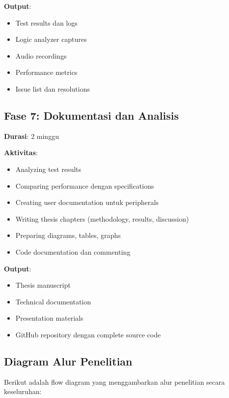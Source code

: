 \textbf{Output}:
\begin{itemize}
	\item Test results dan logs
	\item Logic analyzer captures
	\item Audio recordings
	\item Performance metrics
	\item Issue list dan resolutions
\end{itemize}

\subsection{Fase 7: Dokumentasi dan Analisis}

\textbf{Durasi}: 2 minggu

\textbf{Aktivitas}:
\begin{itemize}
	\item Analyzing test results
	\item Comparing performance dengan specifications
	\item Creating user documentation untuk peripherals
	\item Writing thesis chapters (methodology, results, discussion)
	\item Preparing diagrams, tables, graphs
	\item Code documentation dan commenting
\end{itemize}

\textbf{Output}:
\begin{itemize}
	\item Thesis manuscript
	\item Technical documentation
	\item Presentation materials
	\item GitHub repository dengan complete source code
\end{itemize}

\subsection{Diagram Alur Penelitian}

Berikut adalah flow diagram yang menggambarkan alur penelitian secara keseluruhan:

